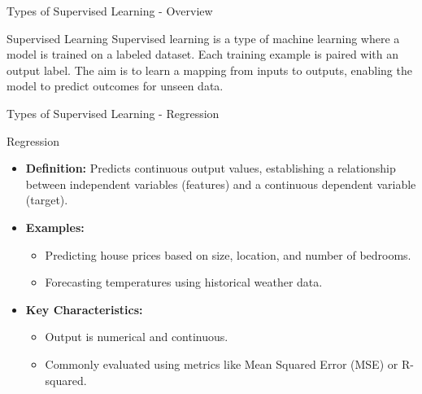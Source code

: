 \documentclass[aspectratio=169]{beamer}
\begin{document}
\begin{frame}[fragile]{Types of Supervised Learning - Overview}
    \begin{block}{Supervised Learning}
        Supervised learning is a type of machine learning where a model is trained on a labeled dataset. Each training example is paired with an output label. The aim is to learn a mapping from inputs to outputs, enabling the model to predict outcomes for unseen data.
    \end{block}
\end{frame}

\begin{frame}[fragile]{Types of Supervised Learning - Regression}
    \begin{block}{Regression}
        \begin{itemize}
            \item \textbf{Definition:} Predicts continuous output values, establishing a relationship between independent variables (features) and a continuous dependent variable (target).
            \item \textbf{Examples:} 
                \begin{itemize}
                    \item Predicting house prices based on size, location, and number of bedrooms.
                    \item Forecasting temperatures using historical weather data.
                \end{itemize}
            \item \textbf{Key Characteristics:}
                \begin{itemize}
                    \item Output is numerical and continuous.
                    \item Commonly evaluated using metrics like Mean Squared Error (MSE) or R-squared.
                \end{itemize}
        \end{itemize}
    \end{block}
\end{frame}
\end{document}
